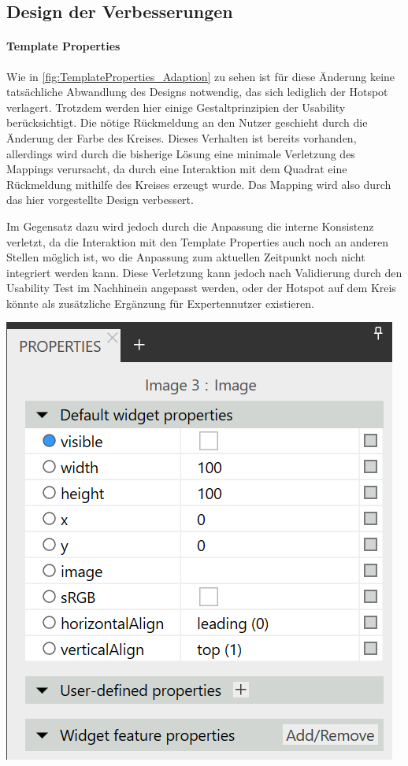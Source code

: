 \subsection{Design der Verbesserungen}

\paragraph{Template Properties}

Wie in \cref{fig:TemplateProperties_Adaption} zu sehen ist für diese Änderung keine tatsächliche Abwandlung des Designs notwendig, das sich lediglich der Hotspot verlagert.
Trotzdem werden hier einige Gestaltprinzipien der Usability berücksichtigt.
Die nötige Rückmeldung an den Nutzer geschieht durch die Änderung der Farbe des Kreises.
Dieses Verhalten ist bereits vorhanden, allerdings wird durch die bisherige Lösung eine minimale Verletzung des Mappings verursacht, da durch eine Interaktion mit dem Quadrat eine Rückmeldung mithilfe des Kreises erzeugt wurde. 
Das Mapping wird also durch das hier vorgestellte Design verbessert.

Im Gegensatz dazu wird jedoch durch die Anpassung die interne Konsistenz verletzt, da die Interaktion mit den Template Properties auch noch an anderen Stellen möglich ist, wo die Anpassung zum aktuellen Zeitpunkt noch nicht integriert werden kann.
Diese Verletzung kann jedoch nach Validierung durch den Usability Test im Nachhinein angepasst werden, oder der Hotspot auf dem Kreis könnte als zusätzliche Ergänzung für Expertennutzer existieren.

\begin{center}
  \includegraphics[scale=0.8]{figures/TemplateProperties_Adaption.png}
  \label{fig:TemplateProperties_Adaption}
\end{center}


